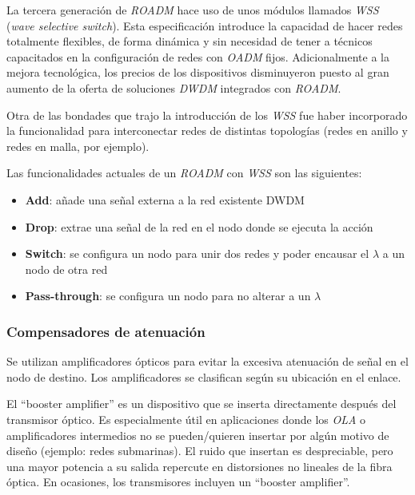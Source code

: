 La tercera generación de \emph{ROADM} hace uso de unos módulos
llamados \emph{WSS} (\emph{wave selective switch}). Esta
especificación introduce la capacidad de hacer redes totalmente
flexibles, de forma dinámica y sin necesidad de tener a técnicos
capacitados en la configuración de redes con \emph{OADM}
fijos. Adicionalmente a la mejora tecnológica, los precios de los
dispositivos disminuyeron puesto al gran aumento de la oferta de
soluciones \emph{DWDM} integrados con \emph{ROADM}.

Otra de las bondades que trajo la introducción de los \emph{WSS} fue
haber incorporado la funcionalidad para interconectar redes de
distintas topologías (redes en anillo y redes en malla, por
ejemplo).


Las funcionalidades actuales de un \emph{ROADM} con \emph{WSS} son las
siguientes:
\begin{itemize}
\item \textbf{Add}: añade una señal externa a la red existente DWDM
\item \textbf{Drop}: extrae una señal de la red en el nodo donde se ejecuta la
  acción
\item \textbf{Switch}: se configura un nodo para unir dos redes y poder
  encausar el $\lambda$ a un nodo de otra red
\item \textbf{Pass-through}: se configura un nodo para no alterar a un
  $\lambda$
\end{itemize}

\subsubsection{Compensadores de atenuación}
\label{sec:amplificadores}


Se utilizan amplificadores ópticos para evitar la excesiva atenuación
de señal en el nodo de destino. Los amplificadores se clasifican según
su ubicación en el enlace.

El ``booster amplifier'' es un dispositivo que se inserta directamente
después del transmisor óptico. Es especialmente útil en aplicaciones
donde los \emph{OLA} o amplificadores intermedios no se pueden/quieren
insertar por algún motivo de diseño (ejemplo: redes submarinas). El
ruido que insertan es despreciable, pero una mayor potencia a su
salida repercute en distorsiones no lineales de la fibra óptica. En
ocasiones, los transmisores incluyen un ``booster amplifier''.

